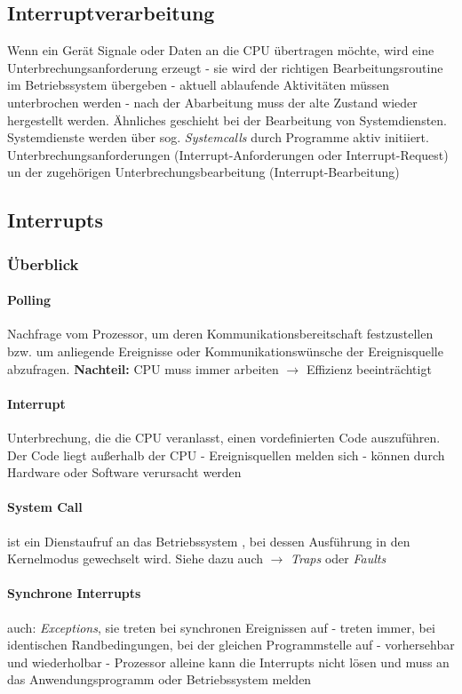 \documentclass[11pt,a4paper,landscape]{article}
\begin{document}
\begin{multicols*}{3}
	\section{Interruptverarbeitung}
	Wenn ein Gerät Signale oder Daten an die CPU übertragen möchte, wird eine Unterbrechungsanforderung erzeugt - sie wird der richtigen Bearbeitungsroutine im Betriebssystem übergeben - aktuell ablaufende Aktivitäten müssen unterbrochen werden - nach der Abarbeitung muss der alte Zustand wieder hergestellt werden. Ähnliches geschieht bei der Bearbeitung von Systemdiensten. Systemdienste werden über sog. \textit{Systemcalls} durch Programme aktiv initiiert. Unterbrechungsanforderungen (Interrupt-Anforderungen oder Interrupt-Request) un der zugehörigen Unterbrechungsbearbeitung (Interrupt-Bearbeitung)
	\subsection{Interrupts}
	\subsubsection{Überblick}
	\paragraph{Polling} Nachfrage vom Prozessor, um deren Kommunikationsbereitschaft festzustellen bzw. um anliegende Ereignisse oder Kommunikationswünsche der Ereignisquelle abzufragen. \textbf{Nachteil:} CPU muss immer arbeiten $\rightarrow$ Effizienz beeinträchtigt
	\paragraph{Interrupt} Unterbrechung, die die CPU veranlasst, einen vordefinierten Code auszuführen. Der Code liegt außerhalb der CPU - Ereignisquellen melden sich - können durch Hardware oder Software verursacht werden
	\paragraph{System Call} ist ein Dienstaufruf an das Betriebssystem , bei dessen Ausführung in den Kernelmodus gewechselt wird. Siehe dazu auch $\rightarrow$ \textit{Traps} oder \textit{Faults}
	\paragraph{Synchrone Interrupts} auch: \textit{Exceptions}, sie treten bei synchronen Ereignissen auf - treten immer, bei identischen Randbedingungen, bei der gleichen Programmstelle auf - vorhersehbar und wiederholbar - Prozessor alleine kann die Interrupts nicht lösen und muss an das Anwendungsprogramm oder Betriebssystem melden

\end{multicols*}
\end{document}
